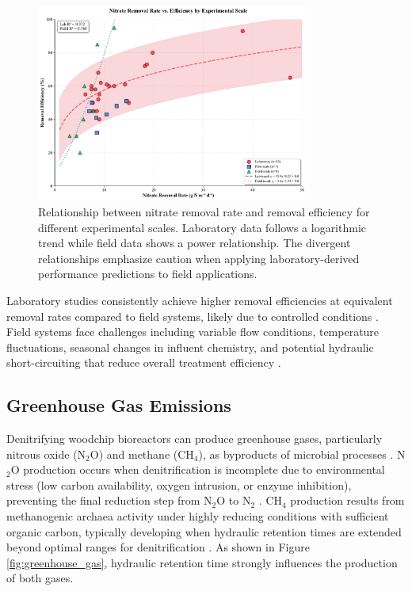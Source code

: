 \documentclass[12pt,a4paper]{article}
\begin{document}
\begin{figure}[ht]
\centering
\includegraphics[width=0.8\textwidth]{fig2_rate_efficiency_scientific}
\caption{Relationship between nitrate removal rate and removal efficiency for different experimental scales. Laboratory data follows a logarithmic trend while field data shows a power relationship. The divergent relationships emphasize caution when applying laboratory-derived performance predictions to field applications.}
\label{fig:rate_vs_efficiency}
\end{figure}

Laboratory studies consistently achieve higher removal efficiencies at equivalent removal rates compared to field systems, likely due to controlled conditions \citep{RN611}. Field systems face challenges including variable flow conditions, temperature fluctuations, seasonal changes in influent chemistry, and potential hydraulic short-circuiting that reduce overall treatment efficiency \citep{RN312, RN309}.

\subsection{Greenhouse Gas Emissions}

Denitrifying woodchip bioreactors can produce greenhouse gases, particularly nitrous oxide (N$_{2}$O) and methane (CH$_{4}$), as byproducts of microbial processes \citep{RN1181, RN611}. N$_{2}$O production occurs when denitrification is incomplete due to environmental stress (low carbon availability, oxygen intrusion, or enzyme inhibition), preventing the final reduction step from N$_{2}$O to N$_{2}$ \citep{RN708}. CH$_{4}$ production results from methanogenic archaea activity under highly reducing conditions with sufficient organic carbon, typically developing when hydraulic retention times are extended beyond optimal ranges for denitrification \citep{RN708}. As shown in Figure \ref{fig:greenhouse_gas}, hydraulic retention time strongly influences the production of both gases.
\end{document}
